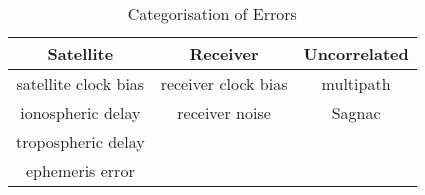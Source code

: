 \begin{table}
\centering
\caption{Categorisation of Errors}
\label{Table:error catagory}
\begin{tabular}{|c|c|c|}
\hline
Satellite & Receiver & Uncorrelated \\\hline
satellite clock bias & receiver clock bias & multipath \\
ionospheric delay & receiver noise& Sagnac \\
tropospheric delay & &  \\
ephemeris error & & \\\hline
\end{tabular}
\end{table}

